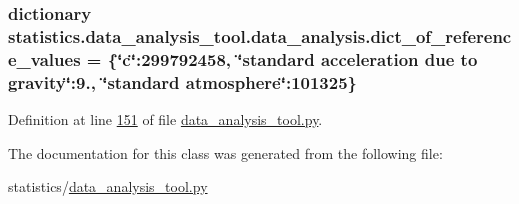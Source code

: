 \subsubsection[{dict\+\_\+of\+\_\+reference\+\_\+values}]{\setlength{\rightskip}{0pt plus 5cm}dictionary statistics.\+data\+\_\+analysis\+\_\+tool.\+data\+\_\+analysis.\+dict\+\_\+of\+\_\+reference\+\_\+values = \{\char`\"{}c\char`\"{}\+:299792458, \char`\"{}standard acceleration due to gravity\char`\"{}\+:9., \char`\"{}standard atmosphere\char`\"{}\+:101325\}\hspace{0.3cm}{\ttfamily [static]}}\label{classstatistics_1_1data__analysis__tool_1_1data__analysis_a946ccd65157a8c3b3b9be607fcaed9f6}


Definition at line \hyperlink{data__analysis__tool_8py_source_l00151}{151} of file \hyperlink{data__analysis__tool_8py_source}{data\+\_\+analysis\+\_\+tool.\+py}.



The documentation for this class was generated from the following file\+:\begin{DoxyCompactItemize}
\item 
statistics/\hyperlink{data__analysis__tool_8py}{data\+\_\+analysis\+\_\+tool.\+py}\end{DoxyCompactItemize}
